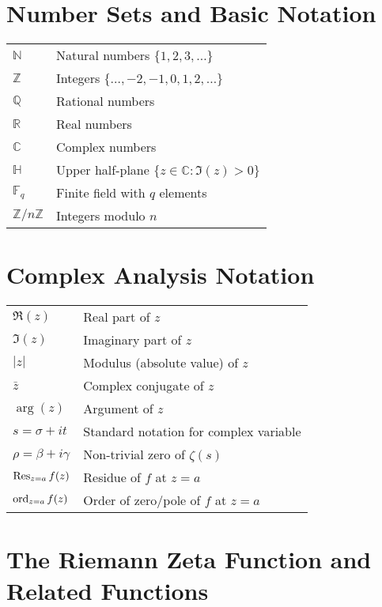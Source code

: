 
\section{Number Sets and Basic Notation}

\begin{tabular}{ll}
$\mathbb{N}$ & Natural numbers $\{1, 2, 3, \ldots\}$ \\
$\mathbb{Z}$ & Integers $\{\ldots, -2, -1, 0, 1, 2, \ldots\}$ \\
$\mathbb{Q}$ & Rational numbers \\
$\mathbb{R}$ & Real numbers \\
$\mathbb{C}$ & Complex numbers \\
$\mathbb{H}$ & Upper half-plane $\{z \in \mathbb{C} : \Im(z) > 0\}$ \\
$\mathbb{F}_q$ & Finite field with $q$ elements \\
$\mathbb{Z}/n\mathbb{Z}$ & Integers modulo $n$ \\
\end{tabular}

\section{Complex Analysis Notation}

\begin{tabular}{ll}
$\Re(z)$ & Real part of $z$ \\
$\Im(z)$ & Imaginary part of $z$ \\
$|z|$ & Modulus (absolute value) of $z$ \\
$\bar{z}$ & Complex conjugate of $z$ \\
$\arg(z)$ & Argument of $z$ \\
$s = \sigma + it$ & Standard notation for complex variable \\
$\rho = \beta + i\gamma$ & Non-trivial zero of $\zeta(s)$ \\
$\operatorname{Res}_{z=a} f(z)$ & Residue of $f$ at $z = a$ \\
$\operatorname{ord}_{z=a} f(z)$ & Order of zero/pole of $f$ at $z = a$ \\
\end{tabular}

\section{The Riemann Zeta Function and Related Functions}

